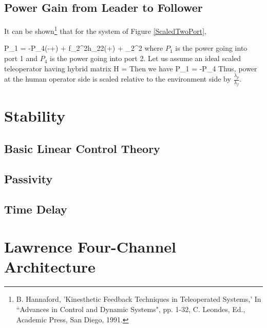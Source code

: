 
\subsection{Power Gain from Leader to Follower}

It can be shown\footnote{ B. Hannaford,  'Kinesthetic Feedback Techniques in Teleoperated Systems,'  In ``Advances in Control and Dynamic Systems", pp. 1-32, C. Leondes, Ed., Academic Press, San Diego, 1991.} that for the system of Figure \ref{ScaledTwoPort},

\bq
P_1 = -P_4\left(-+\right)
     + f_2^2h_{22}\left(+\right)
     + _2^2
\eq
where $P_1$ is the power going into port 1 and $P_4$ is the power going into port 2.
Let us assume an ideal scaled teleoperator having hybrid matrix
\bq
H = 
\eq
Then we have
\bq
P_1 = -P_4
\eq
Thus, power at the human operator side is scaled relative to the environment side by $\frac{\lambda_p}{\lambda_f}$.




\section{Stability}
\subsection{Basic Linear Control Theory}
\subsection{Passivity}
\subsection{Time Delay}


\section{Lawrence Four-Channel Architecture}


